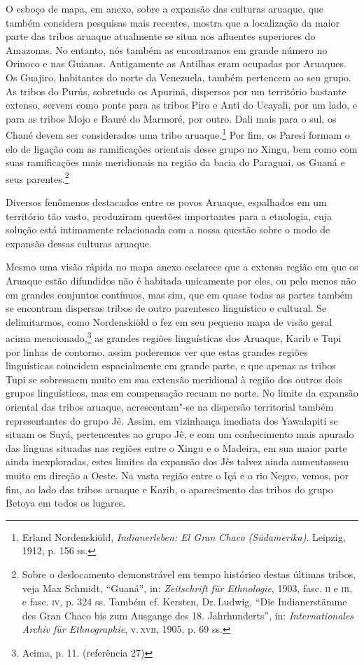 O esboço de mapa, em anexo, sobre a expansão das culturas aruaque, que
também considera pesquisas mais recentes, mostra que a localização da
maior parte das tribos aruaque atualmente se situa nos afluentes
superiores do Amazonas. No entanto, nós também as encontramos em grande
número no Orinoco e nas Guianas. Antigamente as Antilhas eram ocupadas
por Aruaques. Os Guajiro, habitantes do norte da Venezuela, também
pertencem ao seu grupo. As tribos do Purús, sobretudo os Apurinã,
dispersos por um território bastante extenso, servem como ponte para as
tribos Piro e Anti do Ucayali, por um lado, e para as tribos Mojo e
Bauré do Marmoré, por outro. Dali mais para o sul, os Chané devem ser
considerados uma tribo aruaque.\footnote{Erland Nordenskiöld,
  \emph{Indianerleben: El Gran Chaco (Südamerika)}. Leipzig, 1912, p.
  156 ss.} Por fim, os Paresí formam o elo de ligação com as
ramificações orientais desse grupo no Xingu, bem como com suas
ramificações mais meridionais na região da bacia do Paraguai, os Guaná e
seus parentes.\footnote{Sobre o deslocamento demonstrável em tempo
  histórico destas últimas tribos, veja Max Schmidt, ``Guaná'', in:
  \emph{Zeitschrift für Ethnologie}, 1903, fasc. \textsc{ii} e \textsc{iii}, e fasc. \textsc{iv},
  p. 324 ss. Também cf. Kersten, Dr.\,Ludwig, ``Die Indianerstämme des
  Gran Chaco bis zum Ausgange des 18. Jahrhunderts'', in:
  \emph{Internationales Archiv für Ethnographie}, v.\,\textsc{xvii}, 1905, p. 69
  ss.}

Diversos fenômenos destacados entre os povos Aruaque, espalhados em um
território tão vasto, produziram questões importantes para a etnologia,
cuja solução está intimamente relacionada com a nossa questão sobre o
modo de expansão dessas culturas aruaque.

Mesmo uma visão rápida no mapa anexo esclarece que a extensa região em
que os Aruaque estão difundidos não é habitada unicamente por eles, ou
pelo menos não em grandes conjuntos contínuos, mas sim, que em quase
todas as partes também se encontram dispersas tribos de outro
parentesco linguístico e cultural. Se delimitarmos, como Nordenskiöld o
fez em seu pequeno mapa de visão geral acima mencionado,\footnote{Acima,
  p. 11. (referência 27)} as grandes regiões linguísticas dos Aruaque,
Karib e Tupi por linhas de contorno, assim poderemos ver que estas
grandes regiões linguísticas coincidem espacialmente em grande parte, e
que apenas as tribos Tupi se sobressaem muito em sua extensão meridional
à região dos outros dois grupos linguísticos, mas em compensação recuam
no norte. No limite da expansão oriental das tribos aruaque,
acrescentam"-se na dispersão territorial também representantes do grupo
Jê. Assim, em vizinhança imediata dos Yawalapiti se situam os Suyá,
pertencentes ao grupo Jê, e com um conhecimento mais apurado das línguas
situadas nas regiões entre o Xingu e o Madeira, em sua maior parte ainda
inexploradas, estes limites da expansão dos Jês talvez ainda aumentassem
muito em direção a Oeste. Na vasta região entre o Içá e o rio Negro,
vemos, por fim, ao lado das tribos aruaque e Karib, o aparecimento das
tribos do grupo Betoya em todos os lugares.

